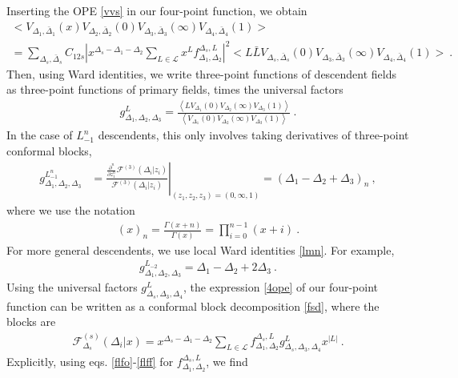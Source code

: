 \documentclass[12pt, a4paper, notitlepage, twoside]{report}
\numberwithin{equation}{section}
\theoremstyle{break}
\begin{document}
Inserting the OPE \eqref{vvs} in our four-point function, we obtain
\begin{multline}
 \Big< V_{\Delta_1,\bar\Delta_1}(x) V_{\Delta_2,\bar\Delta_2}(0)V_{\Delta_3,\bar\Delta_3}(\infty)V_{\Delta_4,\bar\Delta_4}(1)\Big>
 \\
 = 
 \sum_{\Delta_s,\bar\Delta_s} C_{12s} 
 \left| x^{\Delta_s-\Delta_1-\Delta_2}\sum_{L\in\mathcal{L}} x^Lf^{\Delta_s,L}_{\Delta_1,\Delta_2} \right|^2
 \Big< L\bar L V_{\Delta_s,\bar\Delta_s}(0) V_{\Delta_3,\bar\Delta_3}(\infty) V_{\Delta_4,\bar\Delta_4}(1) \Big>\ .
 \label{4ope}
\end{multline}
Then, using Ward identities, we write three-point functions of descendent fields as three-point functions of primary fields, times the universal factors
\begin{align}
g^{L}_{\Delta_1,\Delta_2,\Delta_3} = 
 \frac{ \left< L V_{\Delta_1}(0)V_{\Delta_2}(\infty)V_{\Delta_3}(1)\right> }{  \left<  V_{\Delta_1}(0)V_{\Delta_2}(\infty)V_{\Delta_3}(1)\right>}\ .
 \label{glvv}
\end{align}
In the case of $L_{-1}^n$ descendents, this only involves taking derivatives of three-point conformal blocks, 
\begin{align}
 g^{L_{-1}^n}_{\Delta_1,\Delta_2,\Delta_3} & =\left. \frac{\frac{\partial^n}{\partial z_1^n} \mathcal{F}^{(3)}(\Delta_i|z_i)}{\mathcal{F}^{(3)}(\Delta_i|z_i)}\right|_{(z_1,z_2,z_3)=(0,\infty,1)} =(\Delta_1-\Delta_2+\Delta_3)_n \ ,
 \label{gln}
\end{align}
where we use the notation
\begin{align}
 (x)_n = \frac{\Gamma(x+n)}{\Gamma(x)} = \prod_{i=0}^{n-1}(x+i)\ .
\label{xn}
\end{align}
For more general descendents, we use local Ward identities \eqref{lmn}. For example,
\begin{align}
 g^{L_{-2}}_{\Delta_1,\Delta_2,\Delta_3}
 = \Delta_1-\Delta_2+2\Delta_3\ .
 \label{glt}
\end{align}
Using the universal factors $g^L_{\Delta_s,\Delta_3,\Delta_4}$, the expression \eqref{4ope} of our four-point function can be written as a conformal block decomposition \eqref{fsd}, where the blocks are 
\begin{align}
 \mathcal{F}^{(s)}_{\Delta_s}(\Delta_i|x) = x^{\Delta_s-\Delta_1-\Delta_2}\sum_{L\in\mathcal{L}} f_{\Delta_1,\Delta_2}^{\Delta_s,L} g^{L}_{\Delta_s,\Delta_3,\Delta_4}x^{|L|}\ .
\label{gsd}
\end{align}
Explicitly, using eqs. \eqref{flfo}-\eqref{flff} for $f_{\Delta_1,\Delta_2}^{\Delta_s,L}$, we find 
\end{document}
